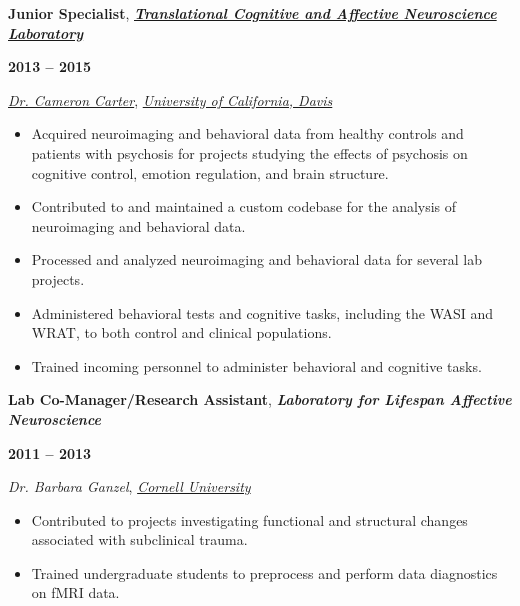 \documentclass[10pt]{article}
\begin{document}
\bigskip

\begin{minipage}[t]{.85\linewidth}
\flushleft
\noindent
\textbf{Junior Specialist},
\href{http://carterlab.ucdavis.edu/front/index.php}
{\emph{\textbf{Translational Cognitive and Affective Neuroscience Laboratory}}}
\end{minipage}
\hfill
\begin{minipage}[t]{.15\linewidth}
\flushright
\noindent
\textsc{\textbf{2013 -- 2015}}
\end{minipage}

\href{http://carterlab.ucdavis.edu/people/carter.php}{\emph{Dr. Cameron Carter}},
\href{https://www.ucdavis.edu}{\emph{University of California, Davis}}

\begin{itemize}[noitemsep, nolistsep]
\item
  Acquired neuroimaging and behavioral data from healthy controls and
  patients with psychosis for projects studying the effects of psychosis
  on cognitive control, emotion regulation, and brain structure.
\item
  Contributed to and maintained a custom codebase for the analysis of
  neuroimaging and behavioral data.
\item
  Processed and analyzed neuroimaging and behavioral data for several
  lab projects.
\item
  Administered behavioral tests and cognitive tasks, including the WASI
  and WRAT, to both control and clinical populations.
\item
  Trained incoming personnel to administer behavioral and cognitive
  tasks.
\end{itemize}

\bigskip

\begin{minipage}[t]{.85\linewidth}
\flushleft
\noindent
\textbf{Lab Co-Manager/Research Assistant},
\emph{\textbf{Laboratory for Lifespan Affective Neuroscience}}
\end{minipage}
\hfill
\begin{minipage}[t]{.15\linewidth}
\flushright
\noindent
\textsc{\textbf{2011 -- 2013}}
\end{minipage}

\emph{Dr. Barbara Ganzel},
\href{http://www.cornell.edu}{\emph{Cornell University}}

\begin{itemize}[noitemsep, nolistsep]
\item
  Contributed to projects investigating functional and structural
  changes associated with subclinical trauma.
\item
  Trained undergraduate students to preprocess and perform data
  diagnostics on fMRI data.
\end{itemize}
\end{document}
